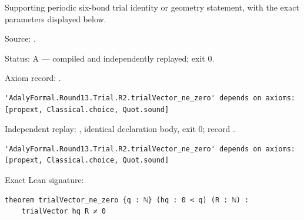 \begin{theorem}[bp-433]
\label{bp-433}
\leanok
Supporting periodic six-bond trial identity or geometry statement, with the exact parameters displayed below.

\par Source: \texttt{}.
\par Status: A — compiled and independently replayed; exit 0.
\par Axiom record: \texttt{}.
\begin{verbatim}
'AdalyFormal.Round13.Trial.R2.trialVector_ne_zero' depends on axioms: [propext, Classical.choice, Quot.sound]
\end{verbatim}
\par Independent replay: \texttt{}, identical declaration body, exit 0; record \texttt{}.
\begin{verbatim}
'AdalyFormal.Round13.Trial.R2.trialVector_ne_zero' depends on axioms: [propext, Classical.choice, Quot.sound]
\end{verbatim}
\par Exact Lean signature:
\begin{verbatim}
theorem trialVector_ne_zero {q : ℕ} (hq : 0 < q) (R : ℕ) :
    trialVector hq R ≠ 0
\end{verbatim}
\end{theorem}

